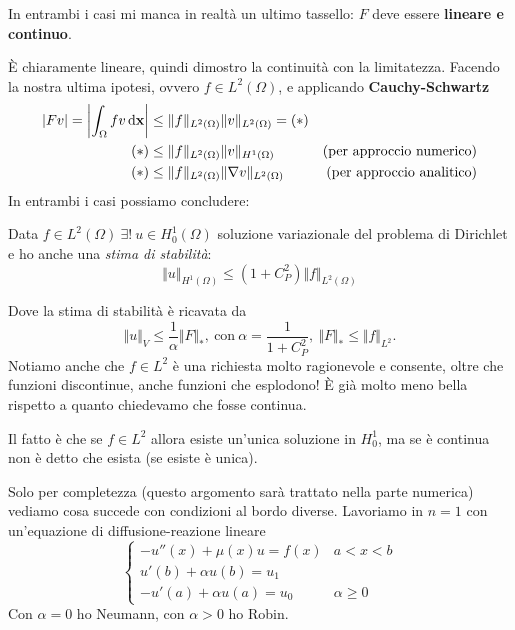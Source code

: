 In entrambi i casi mi manca in realtà un ultimo tassello: $F$ deve essere \textbf{lineare e continuo}.

È chiaramente lineare, quindi dimostro la continuità con la limitatezza. Facendo la nostra ultima ipotesi, ovvero $\displaystyle f\in L^{2}(\Omega)$, e applicando \textbf{Cauchy-Schwartz}
\begin{align*}
    | Fv| =\left| \int _{\Omega } fv\,\mathrm d \mathbf{x}\right| & \leq \Vert f\Vert _{L^{2}(\Omega)}\Vert v\Vert _{L^{2}(\Omega)} =(*)   &                                  \\
    (*)                                         & \leq \Vert f\Vert _{L^{2}(\Omega)}\Vert v\Vert _{H^{1}(\Omega)}        & \text{(per approccio numerico)}  \\
    (*)                                         & \leq \Vert f\Vert _{L^{2}(\Omega)}\Vert \nabla v\Vert _{L^{2}(\Omega)} & \text{(per approccio analitico)}
\end{align*}
In entrambi i casi possiamo concludere:
\begin{theorem}
    Data $\displaystyle f\in L^{2}(\Omega) \ \exists !\ u\in H_{0}^{1}(\Omega)$ soluzione variazionale del problema di Dirichlet e ho anche una \textit{stima di stabilità}:
    \begin{equation*}
        \Vert u\Vert _{H^{1}(\Omega)} \leqslant \left(1+C_{P}^{2}\right)\Vert f\Vert _{L^{2}(\Omega)}
    \end{equation*}
\end{theorem}
Dove la stima di stabilità è ricavata da
\begin{equation*}
    \Vert u\Vert _{V} \leqslant \frac{1}{\alpha }\Vert F\Vert _{*} ,\ \text{con} \ \alpha =\frac{1}{1+C_{P}^{2}} ,\ \Vert F\Vert _{*} \leqslant \Vert f\Vert _{L^{2}} .
\end{equation*}
Notiamo anche che $\displaystyle f\in L^{2}$ è una richiesta molto ragionevole e consente, oltre che funzioni discontinue, anche funzioni che esplodono! È già molto meno bella rispetto a quanto chiedevamo che fosse continua.

Il fatto è che se $\displaystyle f\in L^{2}$ allora esiste un'unica soluzione in $\displaystyle H_{0}^{1}$, ma se è continua non è detto che esista (se esiste è unica).

Solo per completezza (questo argomento sarà trattato nella parte numerica) vediamo cosa succede con condizioni al bordo diverse. Lavoriamo in $n=1$ con un'equazione di diffusione-reazione lineare
\begin{equation*}
    \begin{cases}
        -u''(x) +\mu (x) u=f(x)    & a< x< b            \\
        u'(b) +\alpha u(b) =u_{1}  &                    \\
        -u'(a) +\alpha u(a) =u_{0} & \alpha \geqslant 0
    \end{cases}
\end{equation*}
Con $\displaystyle \alpha =0$ ho Neumann, con $\displaystyle \alpha  >0$ ho Robin.

